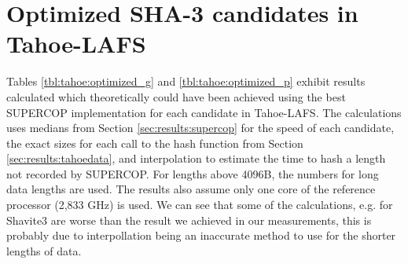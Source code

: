 \documentclass[english,12pt,a4paper]{book}
\begin{document}



\appendix
\appendixpage
\addappheadtotoc

\chapter{Optimized SHA-3 candidates in Tahoe-LAFS}
\label{appendix:optimized_sha3}

Tables \ref{tbl:tahoe:optimized_g} and \ref{tbl:tahoe:optimized_p} exhibit
results calculated which theoretically could have been achieved using the best
\ac{SUPERCOP} implementation for each candidate in Tahoe-\ac{LAFS}. The
calculations uses medians from Section \ref{sec:results:supercop} for the speed
of each candidate, the exact sizes for each call to the hash function from
Section \ref{sec:results:tahoedata}, and interpolation to estimate the time to
hash a length not recorded by \ac{SUPERCOP}. For lengths above 4096B, the
numbers for long data lengths are used. The results also assume only one core
of the reference processor (2,833 GHz) is used. We can see that some of the calculations,
e.g. for Shavite3 are worse than the result we achieved in our measurements,
this is probably due to interpollation being an inaccurate method to use for
the shorter lengths of data. 




\end{document}
